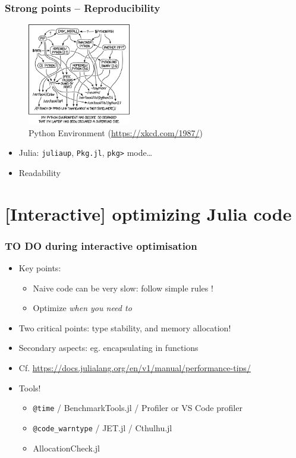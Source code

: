 \documentclass{beamer}
\begin{document}
\begin{frame}
    \frametitle{Strong points -- Reproducibility}
    \begin{figure}[htbp]
        \centering
        \includegraphics[width=0.4\textwidth]{python_environment.png}
        \caption{Python Environment (\url{https://xkcd.com/1987/})}
        \label{fig:xkcd_py_env}
    \end{figure}
    \pause
    \begin{itemize}
        \item Julia: {\tt juliaup}, {\tt Pkg.jl}, {\tt pkg>} mode\dots
        \item Readability
    \end{itemize}
\end{frame}

\section{[Interactive] optimizing Julia code}

\begin{frame}
    \frametitle{TO DO during interactive optimisation}
    \begin{itemize}
        \item Key points:
        \begin{itemize}
            \item Naive code can be very slow: follow simple rules !
            \item Optimize \textit{when you need to}
        \end{itemize}
        \pause
        \item Two critical points: type stability, and memory allocation!
        \item Secondary aspects: eg. encapsulating in functions
        \pause
        \item Cf. \footnotesize{\url{https://docs.julialang.org/en/v1/manual/performance-tips/}}
        \pause
        \item Tools!
        \begin{itemize}
            \item \texttt{@time} / BenchmarkTools.jl / Profiler or VS Code profiler
            \item \texttt{@code\_warntype} / JET.jl / Cthulhu.jl
            \item AllocationCheck.jl
        \end{itemize}
    \end{itemize}
\end{frame}
\end{document}
